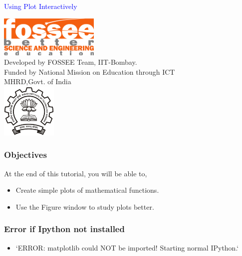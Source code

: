 \documentclass[presentation]{beamer}
\title{}
\author{FOSSEE}
\date{}
\begin{document}
\begin{frame}

\begin{center}
\vspace{12pt}
\textcolor{blue}{\huge Using Plot Interactively}
\end{center}
\vspace{18pt}
\begin{center}
\vspace{10pt}
\includegraphics[scale=0.95]{../images/fossee-logo.png}\\
\vspace{5pt}
\scriptsize Developed by FOSSEE Team, IIT-Bombay. \\ 
\scriptsize Funded by National Mission on Education through ICT\\
\scriptsize  MHRD,Govt. of India\\
\includegraphics[scale=0.30]{../images/iitb-logo.png}\\
\end{center}
\end{frame}
\begin{frame}
\frametitle{Objectives}
\label{sec-2}

  At the end of this tutorial, you will be able to, 

\begin{itemize}
\item Create simple plots of mathematical functions.
\item Use the Figure window to study plots better.
\end{itemize}
\end{frame}
\begin{frame}
\frametitle{Error if Ipython not installed}
\label{sec-3}
\begin{itemize}

\item `ERROR: matplotlib could NOT be imported!  Starting normal IPython.`\\
\label{sec-3_1}%
\end{itemize} %
\end{frame}
\end{document}
